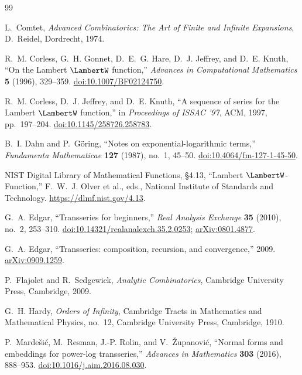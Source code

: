 \documentclass[11pt,oneside,openany]{book}
\begin{document}
\backmatter

\begin{thebibliography}{99}

L.~Comtet,
\emph{Advanced Combinatorics: The Art of Finite and Infinite Expansions},
D.~Reidel, Dordrecht, 1974.

R.~M. Corless, G.~H. Gonnet, D.~E.~G. Hare, D.~J. Jeffrey, and D.~E. Knuth,
``On the Lambert \(\LambertW\) function,''
\emph{Advances in Computational Mathematics} \textbf{5} (1996), 329--359.
\href{https://doi.org/10.1007/BF02124750}{doi:10.1007/BF02124750}.

R.~M. Corless, D.~J. Jeffrey, and D.~E. Knuth,
``A sequence of series for the Lambert \(\LambertW\) function,''
in \emph{Proceedings of ISSAC '97}, ACM, 1997, pp.~197--204.
\href{https://doi.org/10.1145/258726.258783}{doi:10.1145/258726.258783}.

B.~I. Dahn and P.~G\"oring,
``Notes on exponential-logarithmic terms,''
\emph{Fundamenta Mathematicae} \textbf{127} (1987), no.~1, 45--50.
\href{https://doi.org/10.4064/fm-127-1-45-50}{doi:10.4064/fm-127-1-45-50}.

NIST Digital Library of Mathematical Functions,
\S4.13, ``Lambert \(\LambertW\)-Function,''
F.~W.~J. Olver et al., eds., National Institute of Standards and Technology.
\url{https://dlmf.nist.gov/4.13}.

G.~A. Edgar,
``Transseries for beginners,''
\emph{Real Analysis Exchange} \textbf{35} (2010), no.~2, 253--310.
\href{https://doi.org/10.14321/realanalexch.35.2.0253}{doi:10.14321/realanalexch.35.2.0253};
\href{https://arxiv.org/abs/0801.4877}{arXiv:0801.4877}.

G.~A. Edgar,
``Transseries: composition, recursion, and convergence,'' 2009.
\href{https://arxiv.org/abs/0909.1259}{arXiv:0909.1259}.

P.~Flajolet and R.~Sedgewick,
\emph{Analytic Combinatorics},
Cambridge University Press, Cambridge, 2009.

G.~H. Hardy,
\emph{Orders of Infinity},
Cambridge Tracts in Mathematics and Mathematical Physics, no.~12,
Cambridge University Press, Cambridge, 1910.

P.~Marde\v{s}i\'c, M.~Resman, J.-P. Rolin, and V.~\v{Z}upanovi\'c,
``Normal forms and embeddings for power-log transseries,''
\emph{Advances in Mathematics} \textbf{303} (2016), 888--953.
\href{https://doi.org/10.1016/j.aim.2016.08.030}{doi:10.1016/j.aim.2016.08.030}.


\end{thebibliography}
\end{document}
